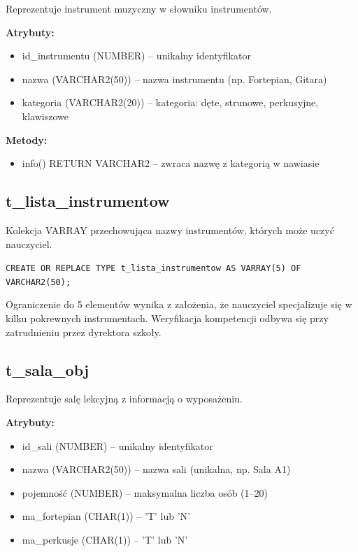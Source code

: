 \documentclass[12pt,a4paper]{article}
\begin{document}
Reprezentuje instrument muzyczny w słowniku instrumentów.

\textbf{Atrybuty:}
\begin{itemize}[nosep]
    \item id\_instrumentu (NUMBER) -- unikalny identyfikator
    \item nazwa (VARCHAR2(50)) -- nazwa instrumentu (np. Fortepian, Gitara)
    \item kategoria (VARCHAR2(20)) -- kategoria: dęte, strunowe, perkusyjne, klawiszowe
\end{itemize}

\textbf{Metody:}
\begin{itemize}[nosep]
    \item info() RETURN VARCHAR2 -- zwraca nazwę z kategorią w nawiasie
\end{itemize}

\subsection{t\_lista\_instrumentow}

Kolekcja VARRAY przechowująca nazwy instrumentów, których może uczyć nauczyciel.

\texttt{CREATE OR REPLACE TYPE t\_lista\_instrumentow AS VARRAY(5) OF VARCHAR2(50);}

Ograniczenie do 5 elementów wynika z założenia, że nauczyciel specjalizuje się w kilku pokrewnych instrumentach. Weryfikacja kompetencji odbywa się przy zatrudnieniu przez dyrektora szkoły.

\subsection{t\_sala\_obj}

Reprezentuje salę lekcyjną z informacją o wyposażeniu.

\textbf{Atrybuty:}
\begin{itemize}[nosep]
    \item id\_sali (NUMBER) -- unikalny identyfikator
    \item nazwa (VARCHAR2(50)) -- nazwa sali (unikalna, np. Sala A1)
    \item pojemność (NUMBER) -- maksymalna liczba osób (1--20)
    \item ma\_fortepian (CHAR(1)) -- 'T' lub 'N'
    \item ma\_perkusje (CHAR(1)) -- 'T' lub 'N'
\end{itemize}
\end{document}
